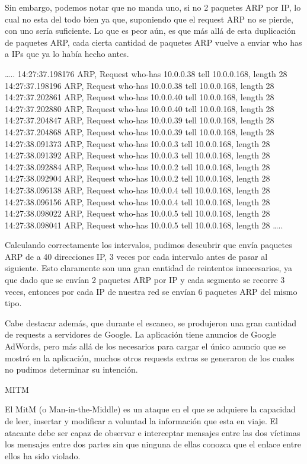 Sin embargo, podemos notar que no manda uno, si no 2 paquetes ARP por IP, lo cual no esta del todo bien ya que, suponiendo que el request ARP no se pierde, con uno sería suficiente. Lo que es peor aún, es que más allá de esta duplicación de paquetes ARP, cada cierta cantidad de paquetes ARP vuelve a enviar who has a IPs que ya lo había hecho antes.

…..
14:27:37.198176 ARP, Request who-has 10.0.0.38 tell 10.0.0.168, length 28
14:27:37.198196 ARP, Request who-has 10.0.0.38 tell 10.0.0.168, length 28
14:27:37.202861 ARP, Request who-has 10.0.0.40 tell 10.0.0.168, length 28
14:27:37.202880 ARP, Request who-has 10.0.0.40 tell 10.0.0.168, length 28
14:27:37.204847 ARP, Request who-has 10.0.0.39 tell 10.0.0.168, length 28
14:27:37.204868 ARP, Request who-has 10.0.0.39 tell 10.0.0.168, length 28
14:27:38.091373 ARP, Request who-has 10.0.0.3 tell 10.0.0.168, length 28
14:27:38.091392 ARP, Request who-has 10.0.0.3 tell 10.0.0.168, length 28
14:27:38.092884 ARP, Request who-has 10.0.0.2 tell 10.0.0.168, length 28
14:27:38.092904 ARP, Request who-has 10.0.0.2 tell 10.0.0.168, length 28
14:27:38.096138 ARP, Request who-has 10.0.0.4 tell 10.0.0.168, length 28
14:27:38.096156 ARP, Request who-has 10.0.0.4 tell 10.0.0.168, length 28
14:27:38.098022 ARP, Request who-has 10.0.0.5 tell 10.0.0.168, length 28
14:27:38.098041 ARP, Request who-has 10.0.0.5 tell 10.0.0.168, length 28
…..
 
Calculando correctamente los intervalos, pudimos descubrir que envía paquetes ARP de a 40 direcciones IP, 3 veces por cada intervalo antes de pasar al siguiente. Esto claramente son una gran cantidad de reintentos innecesarios, ya que dado que se envían 2 paquetes ARP por IP y cada segmento se recorre 3 veces, entonces por cada IP de nuestra red se envían 6 paquetes ARP del mismo tipo. 

Cabe destacar además, que durante el escaneo, se produjeron una gran cantidad de requests a servidores de Google. La aplicación tiene anuncios de Google AdWords, pero más allá de los necesarios para cargar el único anuncio que se mostró en la aplicación, muchos otros requests extras se generaron de los cuales no pudimos determinar su intención.



MITM

El MitM (o Man-in-the-Middle) es un ataque en el que se adquiere la capacidad de leer, insertar y modificar a voluntad la información que esta en viaje. El atacante debe ser capaz de observar e interceptar mensajes entre las dos víctimas los mensajes entre dos partes sin que ninguna de ellas conozca que el enlace entre ellos ha sido violado. 

